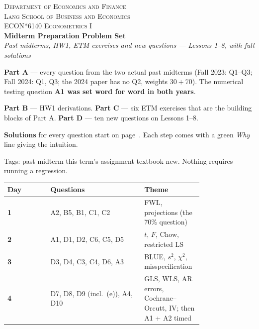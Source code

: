 \documentclass[11pt]{article}
\newcommand{\examtag}[1]{\tcbox[on line, colback=examred, colframe=examred, coltext=white,
  boxsep=1pt, left=3pt, right=3pt, top=0pt, bottom=0pt, arc=1.5pt]{\scriptsize\sffamily\bfseries EXAM #1}}
\newcommand{\hwtag}[1]{\tcbox[on line, colback=hwblue, colframe=hwblue, coltext=white,
  boxsep=1pt, left=3pt, right=3pt, top=0pt, bottom=0pt, arc=1.5pt]{\scriptsize\sffamily\bfseries HW1 #1}}
\newcommand{\etmtag}[1]{\tcbox[on line, colback=gray!60, colframe=gray!60, coltext=white,
  boxsep=1pt, left=3pt, right=3pt, top=0pt, bottom=0pt, arc=1.5pt]{\scriptsize\sffamily\bfseries ETM #1}}
\newcommand{\newtag}{\tcbox[on line, colback=qnavy!60, colframe=qnavy!60, coltext=white,
  boxsep=1pt, left=3pt, right=3pt, top=0pt, bottom=0pt, arc=1.5pt]{\scriptsize\sffamily\bfseries NEW}}
\begin{document}
\begin{center}
  {\footnotesize\scshape Department of Economics and Finance\\
   Lang School of Business and Economics}\\[5pt]
  {\large\scshape ECON*6140 Econometrics I}\\[3pt]
  {\LARGE\bfseries\color{qnavy} Midterm Preparation Problem Set}\\[4pt]
  {\itshape Past midterms, HW1, ETM exercises and new questions --- Lessons 1--8,
  with full solutions}
\end{center}
\vspace{0.9em}

\begin{flatlist}
  \item \textbf{Part A} --- every question from the two actual past midterms
        (Fall 2023: Q1--Q3; Fall 2024: Q1, Q3; the 2024 paper has no Q2, weights $30+70$).
        The numerical testing question \textbf{A1 was set word for word in both years}.
  \item \textbf{Part B} --- HW1 derivations. \textbf{Part C} --- six ETM exercises that are
        the building blocks of Part A. \textbf{Part D} --- ten new questions on Lessons 1--8.
  \item \textbf{Solutions} for every question start on page~\pageref{sec:solutions}.
        Each step comes with a green \emph{Why} line giving the intuition.
  \item Tags: \examtag{} past midterm \quad \hwtag{} this term's assignment
        \quad \etmtag{} textbook \quad \newtag{} new.
        Nothing requires running a regression.
\end{flatlist}

\begin{center}
\renewcommand{\arraystretch}{1.25}
\begin{tabular}{>{\bfseries}l p{0.48\linewidth} p{0.3\linewidth}}
  \toprule
  Day & Questions & Theme \\
  \midrule
  1 & A2, B5, B1, C1, C2 & FWL, projections (the 70\% question) \\
  2 & A1, D1, D2, C6, C5, D5 & $t$, $F$, Chow, restricted LS \\
  3 & D3, D4, C3, C4, D6, A3 & BLUE, $s^{2}$, $\chi^{2}$, misspecification \\
  4 & D7, D8, D9 (incl.\ (e)), A4, D10 & GLS, WLS, AR errors, Cochrane--Orcutt, IV; then A1 + A2 timed \\
  \bottomrule
\end{tabular}
\end{center}
\end{document}
